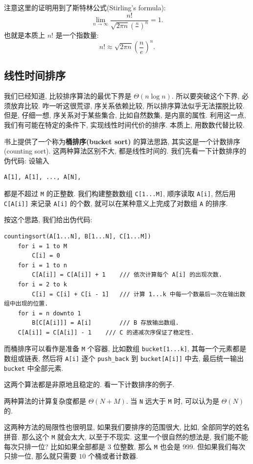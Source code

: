 \documentclass[a4paper]{ctexart}
\theoremstyle{definition}
\theoremstyle{definition}
\begin{document}
注意这里的证明用到了斯特林公式(Stirling's formula):
$$
\lim_{n \to \infty} \frac{n!}{\sqrt{2 \pi n}
  \left(\frac{n}{}\right)^n} = 1.
$$
也就是本质上 $n!$ 是一个指数量:
$$
n! \approx \sqrt{2 \pi n}\left(\frac{n}{e}\right)^n.
$$


\subsection{线性时间排序}

我们已经知道, 比较排序算法的最优下界是 $\Theta(n \log n)$.
所以要突破这个下界, 必须放弃比较. 咋一听这很荒谬, 序关系依赖比较,
所以排序算法似乎无法摆脱比较. 但是, 仔细一想, 序关系对于某些集合, 比如自然数集,
是内禀的属性. 利用这一点, 我们有可能在特定的条件下, 实现线性时间代价的排序.
本质上, 用数数代替比较. 

书上提供了一个称为{\bf 桶排序(bucket sort)} 的算法思路,
其实这是一个计数排序(counting sort). 这两种算法区别不大, 都是线性时间的.
我们先看一下计数排序的伪代码: 设输入
\begin{verbatim}
A[1], A[1], ..., A[N],
\end{verbatim}
都是不超过 \verb|M| 的正整数. 我们构建整数数组 \verb|C[1...M]|,
顺序读取 \verb|A[i]|, 然后用 \verb|C[A[i]]| 来记录 \verb|A[i]| 的个数,
就可以在某种意义上完成了对数组 \verb|A| 的排序.

按这个思路, 我们给出伪代码:

\begin{verbatim}
countingsort(A[1...N], B[1...N], C[1...M])
    for i = 1 to M
        C[i] = 0
    for i = 1 to n
        C[A[i]] = C[A[i]] + 1    /// 依次计算每个 A[i] 的出现次数.
    for i = 2 to k
        C[i] = C[i] + C[i - 1]   /// 计算 1...k 中每一个数最后一次在输出数组中出现的位置.
    for i = n downto 1
        B[C[A[i]]] = A[i]        /// B 存放输出数组.
	C[A[i]] = C[A[i]] - 1    /// C 的递减次序保证了稳定性.
\end{verbatim}
而桶排序可以看作是准备 \verb|M| 个容器, 比如数组 \verb|bucket[1...k]|,
其每一个元素都是数组或链表, 然后将 \verb|A[i]| 逐个 \verb|push_back|
到 \verb|bucket[A[i]]| 中去, 最后统一输出 \verb|bucket| 中全部元素. 

这两个算法都是非原地且稳定的. 看一下计数排序的例子. 

两种算法的计算复杂度都是 $\Theta(N + M)$. 当 \verb|N| 远大于 \verb|M| 时,
可以认为是 $\Theta(N)$ 的.

这两种方法的局限性也很明显, 如果我们要排序的范围很大, 比如,
全部同学的姓名拼音. 那么这个 \verb|M| 就会太大, 以至于不现实.
这里一个很自然的想法是, 我们能不能每次只排一位? 比如如果全部都是 $3$ 位整数,
那么 \verb|M| 也会是 $999$. 但如果我们每次只排一位,
那么就只需要 $10$ 个桶或者计数器. 
\end{document}

